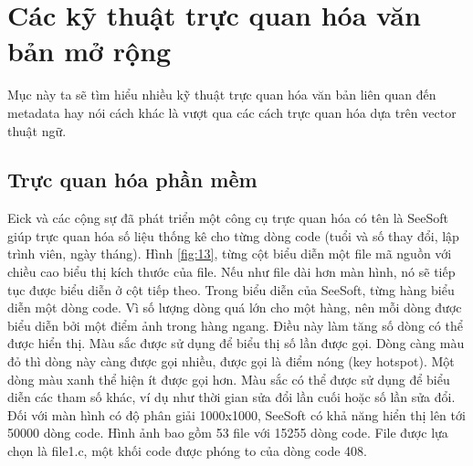 \documentclass[14pt, a4paper]{article}
\numberwithin{equation}{section}
\numberwithin{figure}{section}
\numberwithin{dl}{section}
\numberwithin{md}{section}
\numberwithin{bd}{section}
\numberwithin{dn}{section}
\numberwithin{hq}{section}
\begin{document}
    \section{Các kỹ thuật trực quan hóa văn bản mở rộng}

    Mục này ta sẽ tìm hiểu nhiều kỹ thuật trực quan hóa văn bản liên quan đến metadata hay nói cách khác là vượt qua các cách trực quan hóa dựa trên vector thuật ngữ.

    \subsection{Trực quan hóa phần mềm}

    Eick và các cộng sự đã phát triển một công cụ trực quan hóa có tên là SeeSoft \cite{108} giúp trực quan hóa số liệu thống kê cho từng dòng code (tuổi và số thay đổi, lập trình viên, ngày tháng).
    Hình \ref{fig:13}, từng cột biểu diễn một file mã nguồn với chiều cao biểu thị kích thước của file.
    Nếu như file dài hơn màn hình, nó sẽ tiếp tục được biểu diễn ở cột tiếp theo.
    Trong biểu diễn của SeeSoft, từng hàng biểu diễn một dòng code.
    Vì số lượng dòng quá lớn cho một hàng, nên mỗi dòng được biểu diễn bởi một điểm ảnh trong hàng ngang.
    Điều này làm tăng số dòng có thể được hiển thị.
    Màu sắc được sử dụng để biểu thị số lần được gọi.
    Dòng càng màu đỏ thì dòng này càng được gọi nhiều, được gọi là điểm nóng (key hotspot).
    Một dòng màu xanh thể hiện ít được gọi hơn.
    Màu sắc có thể được sử dụng để biểu diễn các tham số khác, ví dụ như thời gian sửa đổi lần cuối hoặc số lần sửa đổi.
    Đối với màn hình có độ phân giải 1000x1000, SeeSoft có khả năng hiển thị lên tới 50000 dòng code.
    Hình ảnh bao gồm 53 file với 15255 dòng code. 
    File được lựa chọn là file1.c, một khối code được phóng to của dòng code 408.
\end{document}
